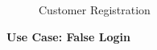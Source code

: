 \documentclass[a4paper,12pt]{report}
\begin{document}
\begin{figure}[!htbp]
	\caption{\label{fig:Use Case Model : } Customer Registration}	
\end{figure}




\vspace{0.5cm}
\textbf{\large Use Case: False Login}
\\
\end{document}
